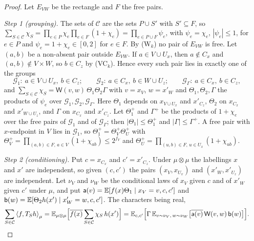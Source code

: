 \begin{proof}
Let $E_{VW}$ be the rectangle and $F$ the free pairs.

\emph{Step 1 (grouping).} The sets of $\mathcal C$ are the sets $P\cup S'$ with
$S'\subseteq F$, so
$\sum_{S\in\mathcal C}\chi_S=\prod_{e\in P}\chi_e\prod_{e\in F}(1+\chi_e)
=\prod_{e\in P\cup F}\psi_e$, with $\psi_e=\chi_e$, $|\psi_e|\le1$, for $e\in P$ and
$\psi_e=1+\chi_e\in[0,2]$ for $e\in F$. By (W$_k$) no pair of $E_{VW}$ is free. Let
$(a,b)$ be a non-absent pair outside $E_{VW}$. If $a\in V\cup U_x$, then
$a\notin C_x$ and $(a,b)\notin V\times W$, so $b\in C_z$ by (VC$_k$). Hence every
such pair lies in exactly one of the groups
\[
 \mathcal G_1:\ a\in V\cup U_x,\ b\in C_z;\qquad
 \mathcal G_2:\ a\in C_x,\ b\in W\cup U_z;\qquad
 \mathcal G_\Gamma:\ a\in C_x,\ b\in C_z,
\]
and $\sum_{S\in\mathcal C}\chi_S=\mathsf W(v,w)\,\Theta_1\Theta_2\Gamma$ with
$v=x_V$, $w=x'_W$ and $\Theta_1,\Theta_2,\Gamma$ the products of $\psi_e$ over
$\mathcal G_1,\mathcal G_2,\mathcal G_\Gamma$. Here $\Theta_1$ depends on
$x_{V\cup U_x}$ and $x'_{C_z}$, $\Theta_2$ on $x_{C_x}$ and $x'_{W\cup U_z}$, and
$\Gamma$ on $x_{C_x}$ and $x'_{C_z}$. Let $\Theta^+_1$ and $\Gamma^+$ be the
products of $1+\chi_e$ over the free pairs of $\mathcal G_1$ and of
$\mathcal G_\Gamma$; then $|\Theta_1|\le\Theta^+_1$ and $|\Gamma|\le\Gamma^+$. A free
pair with $x$-endpoint in $V$ lies in $\mathcal G_1$, so
$\Theta^+_1=\Theta^+_V\Theta^+_U$ with
$\Theta^+_V=\prod_{(a,b)\in F,\,a\in V}(1+\chi_{ab})\le2^{f_V}$ and
$\Theta^+_U=\prod_{(u,b)\in F,\,u\in U_x}(1+\chi_{ub})$.

\emph{Step 2 (conditioning).} Put $c=x_{C_x}$ and $c'=x'_{C_z}$. Under
$\mu\otimes\mu$ the labellings $x$ and $x'$ are independent, so given $(c,c')$ the
pairs $(x_V,x_{U_x})$ and $(x'_W,x'_{U_z})$ are independent. Let $\nu_V$ and
$\nu_W$ be the conditional laws of $x_V$ given $c$ and of $x'_W$ given $c'$ under
$\mu$, and put
$\mathsf a(v)=\mathbb E[f(x)\Theta_1\mid x_V=v,c,c']$ and
$\mathsf b(w)=\mathbb E[\Theta_2h(x')\mid x'_W=w,c,c']$. The characters being real,
\[
 \sum_{S\in\mathcal C}\left\langle f,T_Sh\right\rangle_\mu
 =\mathbb E_{\mu\otimes\mu}\Bigl[\overline{f(x)}\sum_{S\in\mathcal C}\chi_S\,h(x')\Bigr]
 =\mathbb E_{c,c'}\Bigl[\Gamma\,\mathbb E_{v\sim\nu_V,\,w\sim\nu_W}
 \bigl[\overline{\mathsf a(v)}\,\mathsf W(v,w)\,\mathsf b(w)\bigr]\Bigr].
\]


\end{proof}

